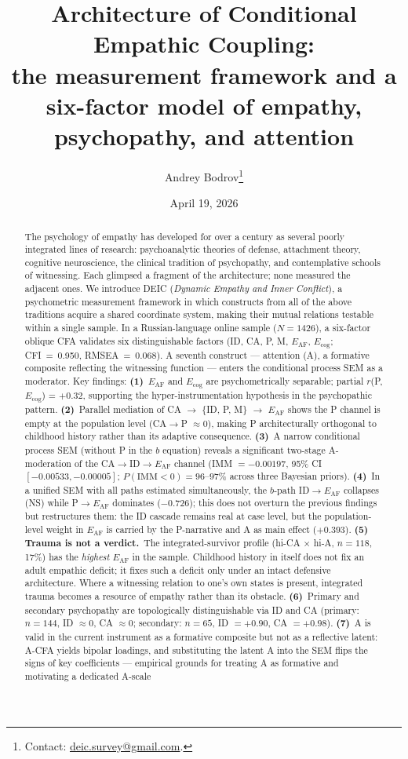 \documentclass[11pt,a4paper]{article}
\title{Architecture of Conditional Empathic Coupling:\\
\large the \DEIC{} measurement framework and a six-factor model of empathy, psychopathy, and attention}
\author{Andrey Bodrov\thanks{Contact: \href{mailto:deic.survey@gmail.com}{deic.survey@gmail.com}.}}
\date{April 19, 2026}
\newcommand{\DEIC}{DEIC}
\begin{document}
\maketitle

\begin{abstract}
\noindent
The psychology of empathy has developed for over a century as several poorly integrated lines of research: psychoanalytic theories of defense, attachment theory, cognitive neuroscience, the clinical tradition of psychopathy, and contemplative schools of witnessing. Each glimpsed a fragment of the architecture; none measured the adjacent ones. We introduce \DEIC{} (\textit{Dynamic Empathy and Inner Conflict}), a psychometric measurement framework in which constructs from all of the above traditions acquire a shared coordinate system, making their mutual relations testable within a single sample. In a Russian-language online sample ($N = 1426$), a six-factor oblique CFA validates six distinguishable factors (ID, CA, P, M, $E_{\mathrm{AF}}$, $E_{\mathrm{cog}}$; CFI~=~0.950, RMSEA~=~0.068). A seventh construct --- attention (A), a formative composite reflecting the witnessing function --- enters the conditional process SEM as a moderator. Key findings: \textbf{(1)}~$E_{\mathrm{AF}}$ and $E_{\mathrm{cog}}$ are psychometrically separable; partial $r$(P, $E_{\mathrm{cog}}$) = $+0.32$, supporting the hyper-instrumentation hypothesis in the psychopathic pattern. \textbf{(2)}~Parallel mediation of CA $\to$ \{ID, P, M\} $\to$ $E_{\mathrm{AF}}$ shows the P channel is empty at the population level (CA$\to$P $\approx 0$), making P architecturally orthogonal to childhood history rather than its adaptive consequence. \textbf{(3)}~A narrow conditional process SEM (without P in the $b$ equation) reveals a significant two-stage A-moderation of the CA$\to$ID$\to E_{\mathrm{AF}}$ channel (IMM $= -0.00197$, 95\% CI $[-0.00533, -0.00005]$; $P(\mathrm{IMM} < 0) = 96$--$97\%$ across three Bayesian priors). \textbf{(4)}~In a unified SEM with all paths estimated simultaneously, the $b$-path ID$\to E_{\mathrm{AF}}$ collapses (NS) while P$\to E_{\mathrm{AF}}$ dominates ($-0.726$); this does not overturn the previous findings but restructures them: the ID cascade remains real at case level, but the population-level weight in $E_{\mathrm{AF}}$ is carried by the P-narrative and A as main effect ($+0.393$). \textbf{(5) Trauma is not a verdict.}~The integrated-survivor profile (hi-CA $\times$ hi-A, $n = 118$, 17\%) has the \emph{highest} $E_{\mathrm{AF}}$ in the sample. Childhood history in itself does not fix an adult empathic deficit; it fixes such a deficit only under an intact defensive architecture. Where a witnessing relation to one's own states is present, integrated trauma becomes a resource of empathy rather than its obstacle. \textbf{(6)}~Primary and secondary psychopathy are topologically distinguishable via ID and CA (primary: $n = 144$, ID $\approx 0$, CA $\approx 0$; secondary: $n = 65$, ID $= +0.90$, CA $= +0.98$). \textbf{(7)}~A is valid in the current instrument as a formative composite but not as a reflective latent: A-CFA yields bipolar loadings, and substituting the latent A into the SEM flips the signs of key coefficients --- empirical grounds for treating A as formative and motivating a dedicated A-scale 
\end{abstract}
\end{document}
